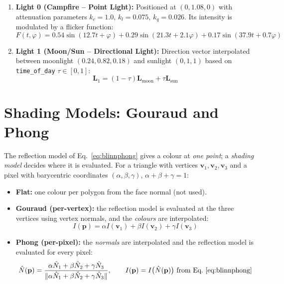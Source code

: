 \documentclass[12pt,a4paper]{report}
\begin{document}
\begin{enumerate}[leftmargin=0.45in]
  \item \textbf{Light 0 (Campfire -- Point Light):} Positioned at $(0, 1.08, 0)$ with attenuation parameters $k_c = 1.0$, $k_l = 0.075$, $k_q = 0.026$.  Its intensity is modulated by a flicker function:
  \begin{equation}
    F(t,\varphi) = 0.54\sin(12.7t + \varphi) + 0.29\sin(21.3t + 2.1\varphi) + 0.17\sin(37.9t + 0.7\varphi)
    \label{eq:flicker}
  \end{equation}

  \item \textbf{Light 1 (Moon/Sun -- Directional Light):} Direction vector interpolated between moonlight $(0.24, 0.82, 0.18)$ and sunlight $(0, 1, 1)$ based on \texttt{time\_of\_day} $\tau \in [0,1]$:
  \begin{equation}
    \mathbf{L}_1 = (1-\tau)\mathbf{L}_{\text{moon}} + \tau \mathbf{L}_{\text{sun}}
    \label{eq:lightdir}
  \end{equation}
\end{enumerate}

\section{Shading Models: Gouraud and Phong}

The reflection model of Eq.~\ref{eq:blinnphong} gives a colour at \emph{one point}; a \emph{shading model} decides where it is evaluated. For a triangle with vertices $\mathbf{v}_1,\mathbf{v}_2,\mathbf{v}_3$ and a pixel with barycentric coordinates $(\alpha,\beta,\gamma)$, $\alpha+\beta+\gamma=1$:

\begin{itemize}[leftmargin=0.45in]
  \item \textbf{Flat:} one colour per polygon from the face normal (not used).
  \item \textbf{Gouraud (per-vertex):} the reflection model is evaluated at the three vertices using vertex normals, and the \emph{colours} are interpolated:
  \begin{equation}
    I(\mathbf{p}) = \alpha I(\mathbf{v}_1)+\beta I(\mathbf{v}_2)+\gamma I(\mathbf{v}_3)
    \label{eq:gouraud}
  \end{equation}
  \item \textbf{Phong (per-pixel):} the \emph{normals} are interpolated and the reflection model is evaluated for every pixel:
  \begin{equation}
    \hat{N}(\mathbf{p}) = \frac{\alpha\hat{N}_1+\beta\hat{N}_2+\gamma\hat{N}_3}{\lVert \alpha\hat{N}_1+\beta\hat{N}_2+\gamma\hat{N}_3\rVert},\qquad I(\mathbf{p}) = I\bigl(\hat{N}(\mathbf{p})\bigr)\ \text{from Eq.~\ref{eq:blinnphong}}
    \label{eq:phongshade}
  \end{equation}
\end{itemize}
\end{document}
